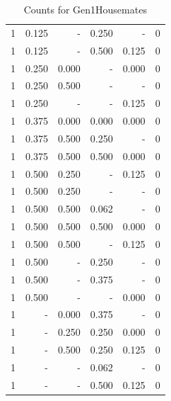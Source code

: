 \documentclass[a4paper]{article}\usepackage[]{graphicx}\usepackage[]{color}
\begin{document}
\begin{table}[ht]
\begin{tabular}{rrrrrr}
   \rowcolor{sosoColor} 1 & 0.125 & - & 0.250 & - & 0 \\ 
   \rowcolor{sosoColor} 1 & 0.125 & - & 0.500 & 0.125 & 0 \\ 
  1 & 0.250 & 0.000 & - & 0.000 & 0 \\ 
  1 & 0.250 & 0.500 & - & - & 0 \\ 
   \rowcolor{nullColor} 1 & 0.250 & - & - & 0.125 & 0 \\ 
   \rowcolor{goodColor} 1 & 0.375 & 0.000 & 0.000 & 0.000 & 0 \\ 
   \rowcolor{badColor} 1 & 0.375 & 0.500 & 0.250 & - & 0 \\ 
   \rowcolor{goodColor} 1 & 0.375 & 0.500 & 0.500 & 0.000 & 0 \\ 
  1 & 0.500 & 0.250 & - & 0.125 & 0 \\ 
  1 & 0.500 & 0.250 & - & - & 0 \\ 
   \rowcolor{badColor} 1 & 0.500 & 0.500 & 0.062 & - & 0 \\ 
   \rowcolor{goodColor} 1 & 0.500 & 0.500 & 0.500 & 0.000 & 0 \\ 
  1 & 0.500 & 0.500 & - & 0.125 & 0 \\ 
   \rowcolor{sosoColor} 1 & 0.500 & - & 0.250 & - & 0 \\ 
   \rowcolor{sosoColor} 1 & 0.500 & - & 0.375 & - & 0 \\ 
   \rowcolor{nullColor} 1 & 0.500 & - & - & 0.000 & 0 \\ 
   \rowcolor{badColor} 1 & - & 0.000 & 0.375 & - & 0 \\ 
   \rowcolor{goodColor} 1 & - & 0.250 & 0.250 & 0.000 & 0 \\ 
   \rowcolor{badColor} 1 & - & 0.500 & 0.250 & 0.125 & 0 \\ 
   \rowcolor{sosoColor} 1 & - & - & 0.062 & - & 0 \\ 
   \rowcolor{sosoColor} 1 & - & - & 0.500 & 0.125 & 0 \\ 
   \hline
\end{tabular}
\caption{Counts for Gen1Housemates} 
\end{table}
\end{document}
